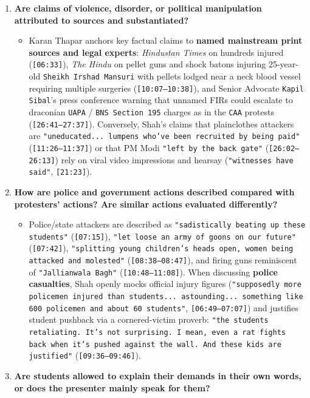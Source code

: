 \documentclass[10pt,a4paper]{article}
\begin{document}
\begin{enumerate}[leftmargin=1.6em, itemsep=4pt, topsep=4pt]
\begin{itemize}[leftmargin=1.4em, itemsep=2pt, topsep=2pt]
  \end{itemize}
  \item \textbf{Are claims of violence, disorder, or political manipulation attributed to sources and substantiated?}
  \begin{itemize}[leftmargin=1.4em, itemsep=2pt, topsep=2pt]
    \item Karan Thapar anchors key factual claims to \textbf{named mainstream print sources and legal experts}: \textit{Hindustan Times} on hundreds injured (\texttt{[06:33]}), \textit{The Hindu} on pellet guns and shock batons injuring 25-year-old \texttt{Sheikh Irshad Mansuri} with pellets lodged near a neck blood vessel requiring multiple surgeries (\texttt{[10:07--10:38]}), and Senior Advocate \texttt{Kapil Sibal}'s press conference warning that unnamed FIRs could escalate to draconian \texttt{UAPA} / \texttt{BNS Section 195} charges as in the \texttt{CAA} protests (\texttt{[26:41--27:37]}). Conversely, Shah's claims that plainclothes attackers are \texttt{"uneducated... lumpens who've been recruited by being paid"} (\texttt{[11:26--11:37]}) or that PM Modi \texttt{"left by the back gate"} (\texttt{[26:02--26:13]}) rely on viral video impressions and hearsay (\texttt{"witnesses have said"}, \texttt{[21:23]}).
  \end{itemize}
  \item \textbf{How are police and government actions described compared with protesters' actions? Are similar actions evaluated differently?}
  \begin{itemize}[leftmargin=1.4em, itemsep=2pt, topsep=2pt]
    \item Police/state attackers are described as \texttt{"sadistically beating up these students"} (\texttt{[07:15]}), \texttt{"let loose an army of goons on our future"} (\texttt{[07:42]}), \texttt{"splitting young children's heads open, women being attacked and molested"} (\texttt{[08:38--08:47]}), and firing guns reminiscent of \texttt{"Jallianwala Bagh"} (\texttt{[10:48--11:08]}). When discussing \textbf{police casualties}, Shah openly mocks official injury figures (\texttt{"supposedly more policemen injured than students... astounding... something like 600 policemen and about 60 students"}, \texttt{[06:49--07:07]}) and justifies student pushback via a cornered-victim proverb: \texttt{"the students retaliating. It's not surprising. I mean, even a rat fights back when it's pushed against the wall. And these kids are justified"} (\texttt{[09:36--09:46]}).
  \end{itemize}
  \item \textbf{Are students allowed to explain their demands in their own words, or does the presenter mainly speak for them?}

\end{enumerate}
\end{document}
